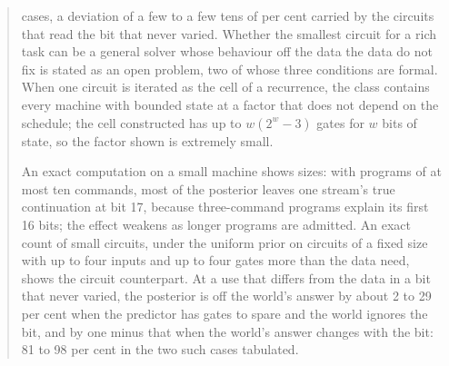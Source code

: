 \documentclass[11pt]{article}
\theoremstyle{definition}
\begin{document}
\begin{abstract}
\begin{itemize}[leftmargin=1.4em,itemsep=1pt,topsep=2pt]
cases, a deviation of a few to a few tens of per cent carried by the circuits that read the bit that never
varied. Whether the smallest circuit for a rich task can be a general solver whose behaviour off the data
the data do not fix is stated as an open problem, two of whose three conditions are formal. When one circuit
is iterated as the cell of a recurrence, the class contains every machine with bounded state at a factor
that does not depend on the schedule; the cell constructed has up to $w(2^w-3)$ gates for $w$ bits of state,
so the factor shown is extremely small.
\end{itemize}
An exact computation on a small machine shows sizes: with programs of at most ten commands, most of the
posterior leaves one stream's true continuation at bit 17, because three-command programs explain its first
16 bits; the effect weakens as longer programs are admitted. An exact count of small circuits, under
the uniform prior on circuits of a fixed size with up to four inputs and up to four gates more than the data
need, shows the circuit counterpart. At a use that differs from the data in a bit that never varied, the
posterior is off the world's answer by about 2 to 29 per cent when the predictor has gates to spare and the
world ignores the bit, and by one minus that when the world's answer changes with the bit: 81 to 98 per cent
in the two such cases tabulated.
\end{abstract}










\end{document}

